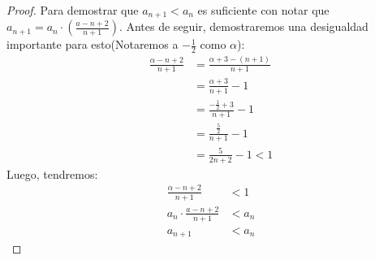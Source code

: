 \documentclass[../main.tex]{subfiles}
\begin{document}
\begin{partes}
\begin{proof}
        Para demostrar que $a_{n+1} < a_n$ es suficiente con notar que $a_{n+1} = a_n \cdot \left(\frac{a-n+2}{n+1}\right)$. Antes de seguir, demostraremos una desigualdad importante para esto(Notaremos a $-\frac{1}{2}$ como $\alpha$):
        \begin{align*}
            \frac{\alpha-n+2}{n+1} &= \frac{\alpha+3 - (n+1)}{n+1}\\
            &= \frac{\alpha + 3}{n+1} - 1\\
            &= \frac{-\frac{1}{2}+ 3}{n+1} - 1\\
            &= \frac{\frac{5}{2}}{n+1} - 1\\
            &= \frac{5}{2n+2} - 1 < 1
        \end{align*}
        Luego, tendremos:
        \begin{align*}
            \frac{\alpha-n+2}{n+1} &< 1\\
            a_n \cdot \frac{a-n+2}{n+1} &< a_n\\
            a_{n+1} &< a_{n}
        \end{align*}
    \end{proof}
\end{partes}
\end{document}
